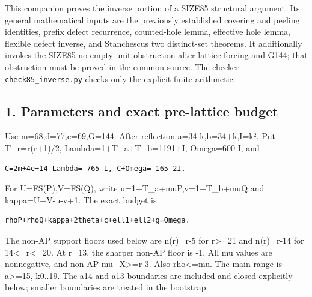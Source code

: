 \documentclass[10pt,a4paper]{article}
\theoremstyle{definition}
\begin{document}
This companion proves the inverse portion of a SIZE85 structural
argument. Its general mathematical inputs are the previously established
covering and peeling identities,\allowbreak{} prefix defect recurrence,\allowbreak{} counted-hole
lemma,\allowbreak{} effective hole lemma,\allowbreak{} flexible defect inverse,\allowbreak{} and
Stanchescu\textquotesingle s two distinct-set theorems. It additionally
invokes the SIZE85 no-empty-unit obstruction after lattice forcing and
G144; that obstruction must be proved in the common source. The checker
\texttt{check85\_\allowbreak{}\allowbreak{}inverse.py} checks only the explicit
finite arithmetic.

\hypertarget{parameters-and-exact-pre-lattice-budget}{%
\subsection{1. Parameters and exact pre-lattice
budget}\label{parameters-and-exact-pre-lattice-budget}}

Use m=\allowbreak{}68,\allowbreak{}d=\allowbreak{}77,\allowbreak{}e=\allowbreak{}69,\allowbreak{}G=\allowbreak{}144. After reflection a=\allowbreak{}34-k,\allowbreak{}b=\allowbreak{}34+\allowbreak{}k,\allowbreak{}I=\allowbreak{}k². Put
T\_\allowbreak{}r=\allowbreak{}r(r+\allowbreak{}1)/2,\allowbreak{} Lambda=\allowbreak{}1+\allowbreak{}T\_\allowbreak{}a+\allowbreak{}T\_\allowbreak{}b=\allowbreak{}1191+\allowbreak{}I,\allowbreak{} Omega=\allowbreak{}600-I,\allowbreak{} and

\begin{lstlisting}
C=2m+4e+14-Lambda=-765-I, C+Omega=-165-2I.
\end{lstlisting}

For U=\allowbreak{}FS(P),\allowbreak{}V=\allowbreak{}FS(Q),\allowbreak{} write u=\allowbreak{}1+\allowbreak{}T\_\allowbreak{}a+\allowbreak{}muP,\allowbreak{}v=\allowbreak{}1+\allowbreak{}T\_\allowbreak{}b+\allowbreak{}muQ and
kappa=\allowbreak{}\textbar U+\allowbreak{}V\textbar-u-v+\allowbreak{}1. The exact budget is

\begin{lstlisting}
rhoP+rhoQ+kappa+2theta+c+ell1+ell2+g=Omega.
\end{lstlisting}

The non-AP support floors used below are n(r)=\allowbreak{}r-5 for r\textgreater=\allowbreak{}21
and n(r)=\allowbreak{}r-14 for 14\textless=\allowbreak{}r\textless=\allowbreak{}20. At r=\allowbreak{}13,\allowbreak{} the sharper non-AP
floor is -1. All mu values are nonnegative,\allowbreak{} and non-AP
mu\_\allowbreak{}X\textgreater=\allowbreak{}r-3. Also rho\textless=\allowbreak{}mu. The main range is
a\textgreater=\allowbreak{}15,\allowbreak{} k0..19. The a14 and a13 boundaries are included and
closed explicitly below; smaller boundaries are treated in the
bootstrap.
\end{document}
